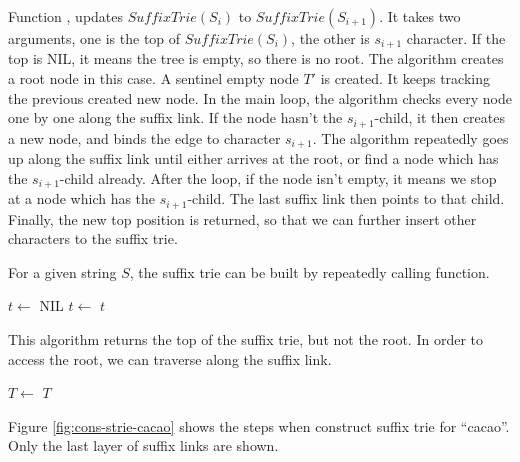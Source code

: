 \documentclass{article}
\begin{document}
Function , updates $SuffixTrie(S_i)$ to $SuffixTrie(S_{i+1})$.
It takes two arguments, one is the top of $SuffixTrie(S_i)$, the other
is $s_{i+1}$ character. If the top is NIL, it means the tree is empty,
so there is no root. The algorithm creates a root node in this case.
A sentinel empty node $T'$ is created. It keeps tracking the previous
created new node. In the main loop, the algorithm checks every node
one by one along the suffix link. If the node hasn't the $s_{i+1}$-child,
it then creates a new node, and binds the edge to character $s_{i+1}$.
The algorithm repeatedly goes up along the suffix link until either
arrives at the root, or find a node which has the $s_{i+1}$-child already.
After the loop, if the node isn't empty, it means we stop at a node
which has the $s_{i+1}$-child.
The last suffix link then points to that child.
Finally, the new top position is returned, so that we can further
insert other characters to the suffix trie.

For a given string $S$, the suffix trie can be built by repeatedly
calling  function.

\begin{algorithmic}[1]
  \State $t \gets$ NIL
    \State $t \gets$ 
  \EndFor
  \State \Return $t$
\EndFunction
\end{algorithmic}

This algorithm returns the top of the suffix trie, but not the root.
In order to access the root, we can traverse along the suffix link.

\begin{algorithmic}[1]
    \State $T \gets$ 
  \EndWhile
  \State \Return $T$
\EndFunction
\end{algorithmic}

Figure \ref{fig:cons-strie-cacao} shows the steps
when construct suffix trie for ``cacao''.
Only the last layer of suffix links are shown.
\end{document}
